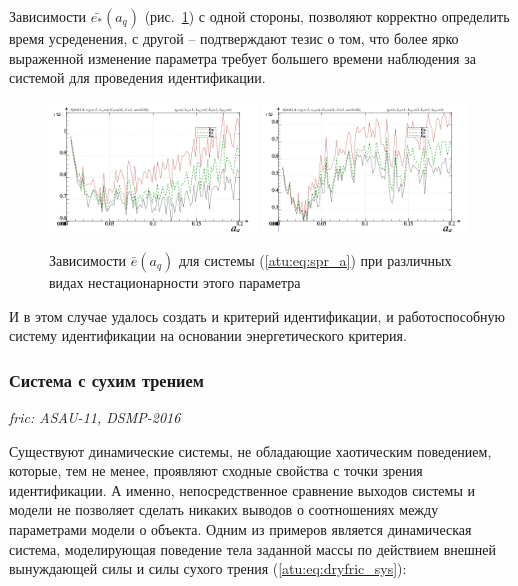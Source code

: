 \documentclass[a4paper,12pt]{article}
\newcommand{\LinkRef}[1]{ \textit{\color{red}#1} }
\begin{document}
Зависимости $\bar{e_*}(a_q)$ (рис.~\ref{atu:f:spr_a_e_a_q})
с одной стороны, позволяют корректно определить время усреденения,
с другой -- подтверждают тезис о том, что более ярко выраженной изменение
параметра требует большего времени наблюдения за системой
для проведения идентификации.

\begin{figure}[htb!]
\centerline{
  \includegraphics[width=0.49\textwidth]{p/cha/spr_a/sprott_a_m5p-p_a_q_e_sign.png}
  \includegraphics[width=0.49\textwidth]{p/cha/spr_a/sprott_a_m5p-p_a_q_e_sin.png}
}
  \caption{Зависимости  $\bar{e}(a_q)$ для системы (\ref{atu:eq:spr_a})
  при различных видах нестационарности этого параметра
}
\label{atu:f:spr_a_e_a_q}
\end{figure}

И в этом случае удалось создать и критерий идентификации, и работоспособную систему идентификации
на основании энергетического критерия.



\FloatBarrier
\subsubsection{Система с сухим трением} %

\LinkRef{
  fric: ASAU-11, DSMP-2016
}

Существуют динамические системы, не обладающие хаотическим поведением,
которые, тем не менее, проявляют сходные свойства с точки зрения идентификации.
А именно, непосредственное сравнение выходов системы и модели не позволяет
сделать никаких выводов о соотношениях между параметрами модели о объекта.
Одним из примеров является динамическая система, моделирующая поведение
тела заданной массы по действием внешней вынуждающей силы и силы сухого трения (\ref{atu:eq:dryfric_sys}):
\end{document}
